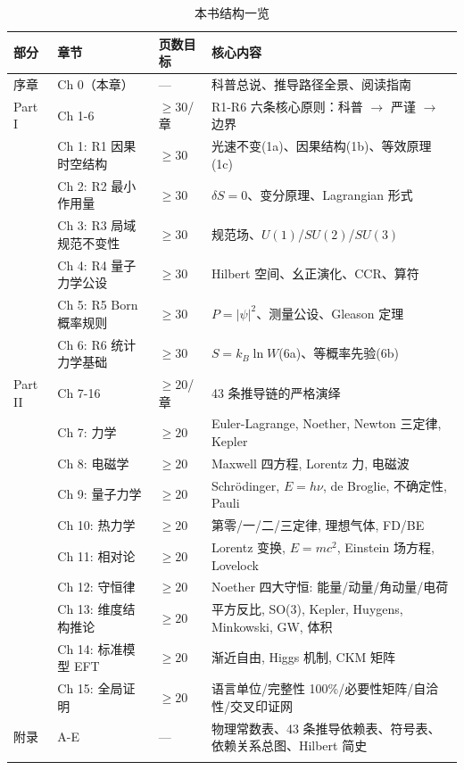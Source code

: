 \begin{center}
\footnotesize
\begin{longtable}{p{1.5cm}p{3.5cm}p{2cm}p{6.5cm}}
\toprule
\textbf{部分} & \textbf{章节} & \textbf{页数目标} & \textbf{核心内容} \\
\midrule
序章 & Ch 0（本章）& — & 科普总说、推导路径全景、阅读指南 \\
\midrule
Part I & Ch 1-6 & $\ge 30$/章 & R1-R6 六条核心原则：科普 $\to$ 严谨 $\to$ 边界 \\
& Ch 1: R1 因果时空结构 & $\ge 30$ & 光速不变(1a)、因果结构(1b)、等效原理(1c) \\
& Ch 2: R2 最小作用量 & $\ge 30$ & $\delta S=0$、变分原理、Lagrangian 形式 \\
& Ch 3: R3 局域规范不变性 & $\ge 30$ & 规范场、$U(1)$/$SU(2)$/$SU(3)$ \\
& Ch 4: R4 量子力学公设 & $\ge 30$ & Hilbert 空间、幺正演化、CCR、算符 \\
& Ch 5: R5 Born 概率规则 & $\ge 30$ & $P=|\psi|^2$、测量公设、Gleason 定理 \\
& Ch 6: R6 统计力学基础 & $\ge 30$ & $S=k_B\ln W$(6a)、等概率先验(6b) \\
\midrule
Part II & Ch 7-16 & $\ge 20$/章 & 43 条推导链的严格演绎 \\
& Ch 7: 力学 & $\ge 20$ & Euler-Lagrange, Noether, Newton 三定律, Kepler \\
& Ch 8: 电磁学 & $\ge 20$ & Maxwell 四方程, Lorentz 力, 电磁波 \\
& Ch 9: 量子力学 & $\ge 20$ & Schr\"odinger, $E=h\nu$, de Broglie, 不确定性, Pauli \\
& Ch 10: 热力学 & $\ge 20$ & 第零/一/二/三定律, 理想气体, FD/BE \\
& Ch 11: 相对论 & $\ge 20$ & Lorentz 变换, $E=mc^2$, Einstein 场方程, Lovelock \\
& Ch 12: 守恒律 & $\ge 20$ & Noether 四大守恒: 能量/动量/角动量/电荷 \\
& Ch 13: 维度结构推论 & $\ge 20$ & 平方反比, SO(3), Kepler, Huygens, Minkowski, GW, 体积 \\
& Ch 14: 标准模型 EFT & $\ge 20$ & 渐近自由, Higgs 机制, CKM 矩阵 \\
& Ch 15: 全局证明 & $\ge 20$ & 语言单位/完整性 100\%/必要性矩阵/自洽性/交叉印证网 \\
\midrule
附录 & A-E & — & 物理常数表、43 条推导依赖表、符号表、依赖关系总图、Hilbert 简史 \\
\bottomrule
\caption{本书结构一览}
\end{longtable}
\end{center}


